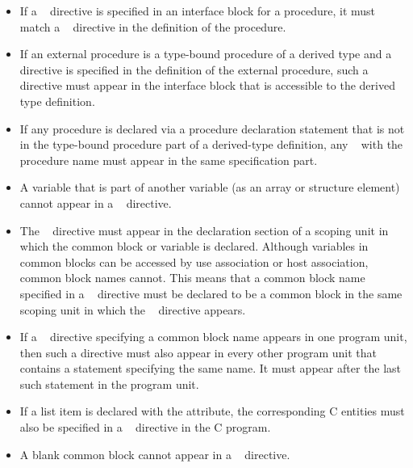 {{{{\begin{itemize}
\item If a ~ directive is specified in an 
      interface block for a procedure, it must match a 
      ~ directive in the definition of the 
      procedure.

\item If an external procedure is a type-bound procedure of a derived 
      type and a ~ directive is specified in 
      the definition of the external procedure, such a directive must 
      appear in the interface block that is accessible to the derived 
      type definition.

\item If any procedure is declared via a procedure declaration statement 
      that is not in the type-bound procedure part of a derived-type 
      definition, any ~ with the procedure 
      name must appear in the same specification part.

\item A variable that is part of another variable (as an array or structure 
      element) cannot appear in a ~ directive.

\item The ~ directive must appear in the 
      declaration section of a scoping unit in which the common block 
      or variable is declared. Although variables in common blocks can 
      be accessed by use association or host association, common block 
      names cannot. This means that a common block name specified in a 
      ~ directive must be declared to be a 
      common block in the same scoping unit in which the 
      ~ directive appears.

\item If a ~ directive specifying a common 
      block name appears in one program unit, then such a directive must 
      also appear in every other program unit that contains a  
      statement specifying the same name. It must appear after the last 
      such  statement in the program unit.

\item If a list item is declared with the  attribute, the 
      corresponding C entities must also be specified in a 
      ~ directive in the C program.

\item A blank common block cannot appear in a ~ 
      directive.


\end{itemize}}}}}
